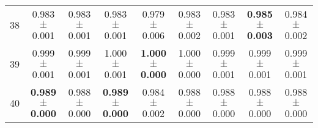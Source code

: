 \begin{table}[!ht]
{\begin{tabular}{r c c c c c c c c}
38 & 0.983 $\pm$ 0.001 & 0.983 $\pm$ 0.001 & 0.983 $\pm$ 0.001 & 0.979 $\pm$ 0.006 & 0.983 $\pm$ 0.002 & 0.983 $\pm$ 0.001 & \textbf{0.985 $\pm$ 0.003} & 0.984 $\pm$ 0.002 \\
39 & 0.999 $\pm$ 0.001 & 0.999 $\pm$ 0.001 & 1.000 $\pm$ 0.001 & \textbf{1.000 $\pm$ 0.000} & 1.000 $\pm$ 0.000 & 0.999 $\pm$ 0.001 & 0.999 $\pm$ 0.001 & 0.999 $\pm$ 0.001 \\
40 & \textbf{0.989 $\pm$ 0.000} & 0.988 $\pm$ 0.000 & \textbf{0.989 $\pm$ 0.000} & 0.984 $\pm$ 0.002 & 0.988 $\pm$ 0.000 & 0.988 $\pm$ 0.000 & 0.988 $\pm$ 0.000 & 0.988 $\pm$ 0.000 \\
\end{tabular}}
\end{table}
